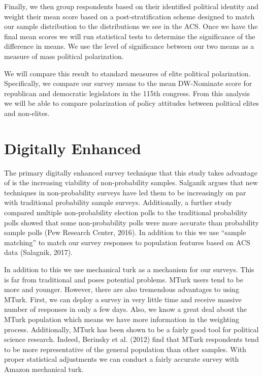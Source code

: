 \documentclass[12pt]{article}
\begin{document}
Finally, we then group respondents based on their identified political identity and weight their mean score based on a post-stratification scheme designed to match our sample distribution to the distributions we see in the ACS. Once we have the final mean scores we will run statistical tests to determine the significance of the difference in means. We use the level of significance between our two means as a measure of mass political polarization. 

We will compare this result to standard measures of elite political polarization. Specifically, we compare our survey means to the mean DW-Nominate score for republican and democratic legislators in the 115th congress. From this analysis we will be able to compare polarization of policy attitudes between political elites and non-elites. 


\section{Digitally Enhanced}

The primary digitally enhanced survey technique that this study takes advantage of is the increasing viability of non-probability samples. Salganik argues that new techniques in non-probability surveys have led them to be increasingly on par with traditional probability sample surveys. Additionally, a further study compared multiple non-probability election polls to the traditional probability polls showed that some non-probability polls were more accurate than probability sample polls (Pew Research Center, 2016). In addition to this we use “sample matching” to match our survey responses to population features based on ACS data (Salagnik, 2017).

In addition to this we use mechanical turk as a mechanism for our surveys. This is far from traditional and poses potential problems. MTurk users tend to be more and younger.  However, there are also tremendous advantages to using MTurk. First, we can deploy a survey in very little time and receive massive number of responses in only a few days. Also, we know a great deal about the MTurk population which means we have more information in the weighting process. Additionally, MTurk has been shown to be a fairly good tool for political science research. Indeed, Berinsky et al. (2012) find that MTurk respondents tend to be more representative of the general population than other samples. With proper statistical adjustments we can conduct a fairly accurate survey with Amazon mechanical turk.
\end{document}
